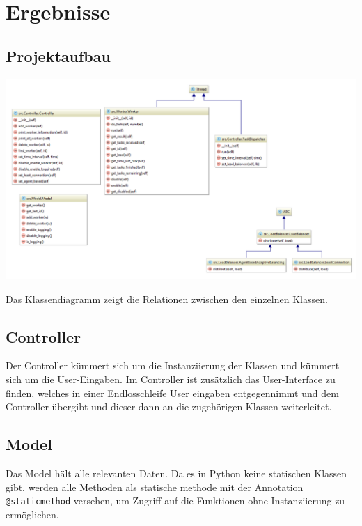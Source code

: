 
\section{Ergebnisse}
\label{sec:Ergebnisse}



\subsection{Projektaufbau}

\begin{minipage}{\linewidth}
	\centering
	\includegraphics[width=1\linewidth]{images/class_diagram}
\end{minipage}

Das Klassendiagramm zeigt die Relationen zwischen den einzelnen Klassen. 

\subsection{Controller}
Der Controller kümmert sich um die Instanziierung der Klassen und kümmert sich um die User-Eingaben.
Im Controller ist zusätzlich das User-Interface zu finden, welches in einer Endlosschleife User eingaben entgegennimmt und dem Controller übergibt und dieser dann an die zugehörigen Klassen weiterleitet. 

\subsection{Model}
Das Model hält alle relevanten Daten. Da es in Python keine statischen Klassen gibt, werden alle Methoden als statische methode mit der Annotation \verb|@staticmethod| versehen, um Zugriff auf die Funktionen ohne Instanziierung zu ermöglichen.

